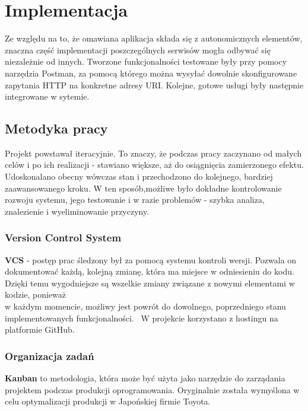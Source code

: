 \chapter{Implementacja}
\label{cha:implementacja}

Ze względu na to, że omawiana aplikacja składa się z autonomicznych elementów, znaczna część implementacji poszczególnych serwisów mogła odbywać się niezależnie od innych. Tworzone funkcjonalności testowane były przy pomocy narzędzia Postman, za pomocą którego można wysyłać dowolnie skonfigurowane zapytania HTTP na konkretne adresy URI. Kolejne, gotowe usługi były następnie integrowane w sytemie.


\section{Metodyka pracy}
Projekt powstawał iteracyjnie. To znaczy, że podczas pracy zaczynano od małych celów i po ich realizacji - stawiano większe, aż do osiągnięcia zamierzonego efektu. Udoskonalano obecny wówczas stan i przechodzono do kolejnego, bardziej zaawansowanego kroku. W ten sposób,możliwe było dokładne kontrolowanie rozwoju systemu, jego testowanie i w razie problemów - szybka analiza, znalezienie i wyeliminowanie przyczyny. 

\subsection{Version Control System}
\textbf{VCS} - postęp prac śledzony był za pomocą systemu kontroli wersji.
Pozwala on dokumentować każdą, kolejną zmianę, która ma miejsce w odniesieniu do kodu. Dzięki temu wygodniejsze są wszelkie zmiany związane z nowymi elementami w kodzie, ponieważ\\w każdym momencie, możliwy jest powrót do dowolnego, poprzedniego stanu implementowanych funkcjonalności.~\cite{vcs}
W projekcie korzystano z hostingu na platformie GitHub.

\subsection{Organizacja zadań}
\textbf{Kanban} to metodologia, która może być użyta jako narzędzie do zarządania projektem podczas produkcji oprogramowania. Oryginalnie została wymyślona w celu optymalizacji produkcji w Japońskiej firmie Toyota.

